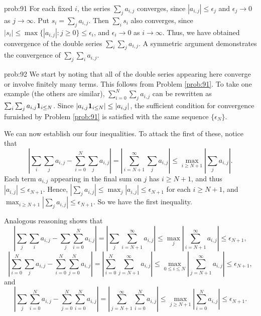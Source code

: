 \begin{sol}{prob:91} For each fixed $i$, the series $\sum_{j} a_{i,j}$ converges, since $|a_{i,j}| \le \epsilon_j$ and $\epsilon_j\to 0$ as $j\to\infty$. Put $s_i = \sum_{j} a_{i,j}$. Then $\sum_{i} s_i$ also converges, since $|s_i| \le \max\{|a_{i,j}|: j \ge 0\} \le \epsilon_i$, and $\epsilon_i\to 0$ as $i\to\infty$. Thus, we have obtained convergence of the double series $\sum_{i} \sum_{j} a_{i,j}$. A symmetric argument demonstrates the convergence of $\sum_{j} \sum_{i} a_{i,j}$.
\end{sol}


\begin{sol}{prob:92} We start by noting that all of the double series appearing here converge or involve finitely many terms. This follows from Problem \ref{prob:91}. To take one example (the others are similar), $\sum_{i=0}^{N}  \sum_{j} a_{i,j}$ can be rewritten as $\sum_{i}\sum_{j} a_{i,j}\mathbf{1}_{i\le N}$. Since $|a_{i,j}\mathbf{1}_{i\le N}| \le |a_{i,j}|$, the sufficient condition for convergence furnished by Problem \ref{prob:91} is satisfied with the same sequence $\{\epsilon_N\}$.

We can now establish our four inequalities. To attack the first of these, notice that 
\[ \left|\sum_{i} \sum_{j} a_{i,j} - \sum_{i=0}^{N} \sum_{j} a_{i,j}\right| =\left|\sum_{i=N+1}^{\infty} \sum_{j} a_{i,j}\right| \le \max_{i\ge N+1} \left|\sum_{j} a_{i,j}\right|.\]
Each term $a_{i,j}$ appearing in the final sum on $j$ has $i\ge N+1$, and thus $|a_{i,j}| \le \epsilon_{N+1}$. Hence, $|\sum_{j} a_{i,j}|  \le \max_{j} |a_{i,j}| \le \epsilon_{N+1}$ for each $i\ge N+1$, and $\max_{i\ge N+1} |\sum_{j} a_{i,j}| \le \epsilon_{N+1}$. So we have the first inequality.

Analogous reasoning shows that
\[ \left|\sum_{j} \sum_{i} a_{i,j} - \sum_{j} \sum_{i=0}^{N} a_{i,j}\right| = \left|\sum_{j} \sum_{i=N+1}^{\infty} a_{i,j}\right| \le \max_{j} \left|\sum_{i=N+1}^{\infty} a_{i,j}\right| \le \epsilon_{N+1},\]
\[ \left|\sum_{i=0}^{N} \sum_{j} a_{i,j} - \sum_{i=0}^{N}\sum_{j=0}^{N} a_{i,j}\right| = \left|\sum_{i=0}^{N} \sum_{j=N+1}^{\infty} a_{i,j}\right| \le \max_{0\le i \le N} \left|\sum_{j=N+1}^{\infty}a_{i,j}\right| \le \epsilon_{N+1}, \]
and
\[ \left|\sum_{j} \sum_{i=0}^{N} a_{i,j} - \sum_{j=0}^{N}\sum_{i=0}^{N} a_{i,j}\right| = \left|\sum_{j=N+1}^{\infty} \sum_{i=0}^{N} a_{i,j}\right| \le \max_{j\ge N+1} \left|\sum_{i=0}^{N}a_{i,j}\right| \le \epsilon_{N+1}. \]


\end{sol}
